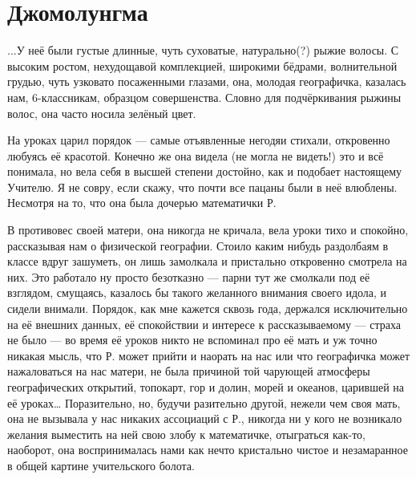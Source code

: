 \section*{Джомолунгма}

...У неё были густые длинные, чуть суховатые, натурально(?) рыжие волосы. С высоким ростом, нехудощавой комплекцией, широкими бёдрами, волнительной грудью, чуть узковато посаженными глазами, она, молодая географичка, казалась нам, 6-классникам, образцом совершенства. Словно для подчёркивания рыжины волос, она часто носила зелёный цвет. 

На уроках царил порядок — самые отъявленные негодяи стихали, откровенно любуясь её красотой. Конечно же она видела (не могла не видеть!) это и всё понимала, но вела себя в высшей степени достойно, как и подобает настоящему Учителю. Я не совру, если скажу, что почти все пацаны были в неё влюблены. Несмотря на то, что она была дочерью математички Р.

В противовес своей матери, она никогда не кричала, вела уроки тихо и спокойно, рассказывая нам о физической географии. Стоило каким нибудь раздолбаям в классе вдруг зашуметь, он лишь замолкала и пристально откровенно смотрела на них. Это работало ну просто безотказно — парни тут же смолкали под её взглядом, смущаясь, казалось бы такого желанного внимания своего идола, и сидели внимали. Порядок, как мне кажется сквозь года, держался исключительно на её внешних данных, её спокойствии и интересе к рассказываемому — страха не было — во время её уроков никто не вспоминал про её мать и уж точно никакая мысль, что Р. может прийти и наорать на нас или что географичка может нажаловаться на нас матери, не была причиной той чарующей атмосферы географических открытий, топокарт, гор и долин, морей и океанов, царившей на её уроках… Поразительно, но, будучи разительно другой, нежели чем своя мать, она не вызывала у нас никаких ассоциаций с Р., никогда ни у кого не возникало желания выместить на ней свою злобу к математичке, отыграться как-то, наоборот, она воспринималась нами как нечто кристально чистое и незамаранное в общей картине учительского болота.
 
